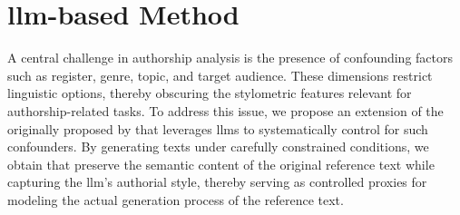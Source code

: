 \chapter{\acs{llm}-based \Imp{} Method}
\label{chap:llm_impostor_method}

A central challenge in authorship analysis is the presence of confounding factors such as register, genre, topic, and target audience. 
These dimensions restrict linguistic options, thereby obscuring the stylometric features relevant for authorship-related tasks. 
To address this issue, we propose an extension of the \impAppr{} originally proposed by \citet{koppel_determining_2014} that leverages \acp{llm} to systematically control for such confounders. 
By generating texts under carefully constrained conditions, we obtain \imps{} that preserve the semantic content of the original reference text while capturing the \ac{llm}'s authorial style, thereby serving as controlled proxies for modeling the actual generation process of the reference text.







